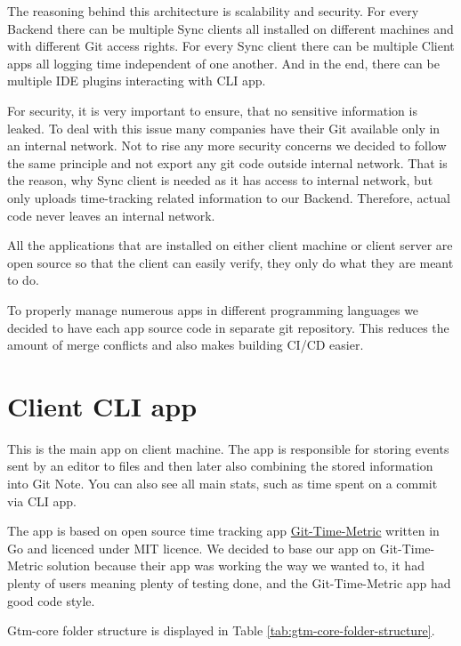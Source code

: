 The reasoning behind this architecture is scalability and security.
For every Backend there can be multiple Sync clients all installed on different machines and with different Git access rights.
For every Sync client there can be multiple Client apps all logging time independent of one another.
And in the end, there can be multiple IDE plugins interacting with CLI app.

For security, it is very important to ensure, that no sensitive information is leaked.
To deal with this issue many companies have their Git available only in an internal network.
Not to rise any more security concerns we decided to follow the same principle and not export any git code outside internal network.
That is the reason, why Sync client is needed as it has access to internal network, but only uploads time-tracking related information to our Backend.
Therefore, actual code never leaves an internal network.

All the applications that are installed on either client machine or client server are open source so that the client can easily verify,
they only do what they are meant to do.

To properly manage numerous apps in different programming languages we decided to have each app source code in separate git repository.
This reduces the amount of merge conflicts and also makes building CI/CD easier.


\section{Client CLI app}\label{sec:cli-app}
This is the main app on client machine.
The app is responsible for storing events sent by an editor to files and then later also combining the stored information into Git Note.
You can also see all main stats, such as time spent on a commit via CLI app.

The app is based on open source time tracking app \href{https://github.com/git-time-metric/gtm}{Git-Time-Metric} written in Go and licenced under MIT licence.
We decided to base our app on Git-Time-Metric solution because their app was working the way we wanted to, it had plenty of users meaning plenty of testing done,
and the Git-Time-Metric app had good code style.

Gtm-core folder structure is displayed in Table
\ref{tab:gtm-core-folder-structure}.

